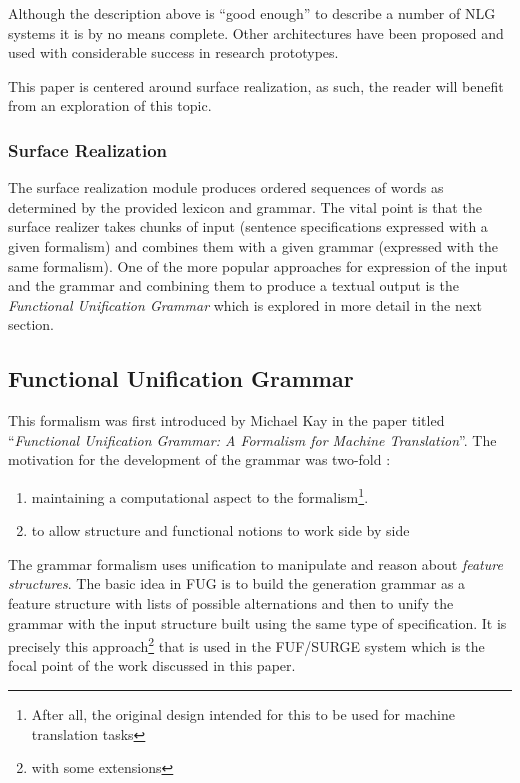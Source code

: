 \documentclass[12pt]{article}
\begin{document}
Although the description above is ``good enough'' to describe a number of NLG systems it is by no
means complete. Other architectures have been proposed and used with 
considerable success in research prototypes.

This paper is centered around surface realization, as such, the reader will benefit from an exploration of this topic.

\subsubsection{Surface Realization}
The surface realization module produces ordered sequences of words as determined by the provided
lexicon and grammar. The vital point is that the surface realizer takes chunks of input (sentence specifications expressed
with a given formalism) and combines them with a given grammar (expressed with the same formalism).
One of the more popular approaches for expression of the input and the grammar and combining them
to produce a textual output is the \textit{Functional Unification Grammar} \cite{fug-kay} 
which is explored in more detail in the next section.


\subsection{Functional Unification Grammar}

This formalism was first introduced by Michael Kay in the paper titled
``\textit{Functional Unification Grammar: A Formalism for Machine Translation}''. 
The motivation for the development of the grammar was two-fold \cite{sheiber-avms}: 

\begin{enumerate}
    \item maintaining a computational aspect to the formalism\footnote{After all, the original 
        design intended for this to be used for machine translation tasks}.
    \item to allow structure and functional notions to work side by side
\end{enumerate}

The grammar formalism uses unification to manipulate and reason about
\textit{feature structures}. The basic
idea in FUG is to build the generation grammar as a feature structure with lists
of possible alternations and then to unify the grammar with the input
structure built using the same type of specification. It is precisely 
this approach\footnote{with some extensions} that is used in the 
{ \selectfont FUF/SURGE} %
system which is the focal point of the work discussed in this paper.
\end{document}
